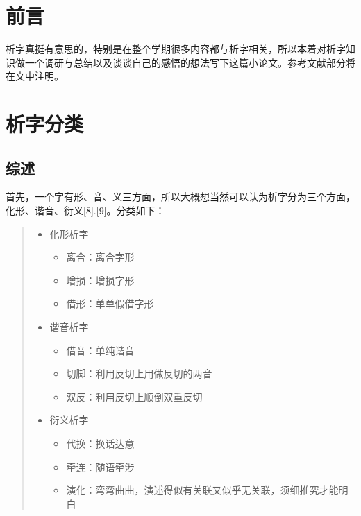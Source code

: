 \documentclass[]{article}
\date{}
\begin{document}
\hypertarget{header-n654}{%
\section{前言}\label{header-n654}}

析字真挺有意思的，特别是在整个学期很多内容都与析字相关，所以本着对析字知识做一个调研与总结以及谈谈自己的感悟的想法写下这篇小论文。参考文献部分将在文中注明。

\hypertarget{header-n223}{%
\section{析字分类}\label{header-n223}}

\hypertarget{header-n695}{%
\subsection{综述}\label{header-n695}}

首先，一个字有形、音、义三方面，所以大概想当然可以认为析字分为三个方面，化形、谐音、衍义{[}8{]}.{[}9{]}。分类如下：

\begin{quote}
\begin{itemize}
\item
  化形析字

  \begin{itemize}
  \item
    离合：离合字形
  \item
    增损：增损字形
  \item
    借形：单单假借字形
  \end{itemize}
\item
  谐音析字

  \begin{itemize}
  \item
    借音：单纯谐音
  \item
    切脚：利用反切上用做反切的两音
  \item
    双反：利用反切上顺倒双重反切
  \end{itemize}
\item
  衍义析字

  \begin{itemize}
  \item
    代换：换话达意
  \item
    牵连：随语牵涉
  \item
    演化：弯弯曲曲，演述得似有关联又似乎无关联，须细推究才能明白
  \end{itemize}
\end{itemize}
\end{quote}
\end{document}
